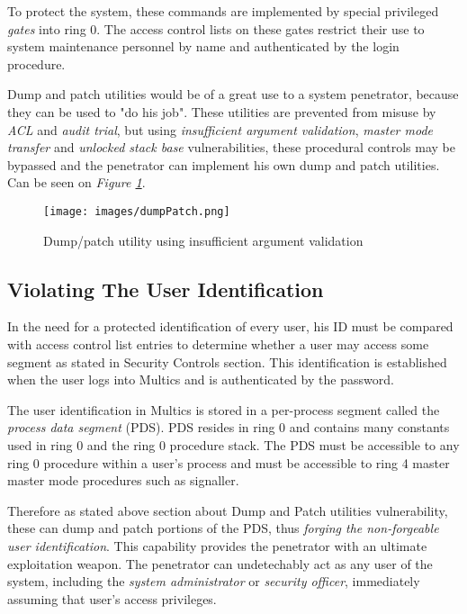 To protect the system, these commands are implemented by special privileged \textit{gates} into ring 0. The access control 
lists on these gates restrict their use to system maintenance personnel by name and authenticated by the login procedure.

Dump and patch utilities would be of a great use to a system penetrator, because they can be used to "do his job". These 
utilities are prevented from misuse by \textit{ACL} and \textit{audit trial}, but using  \textit{insufficient argument
validation}, \textit{master mode transfer} and \textit{unlocked stack base} vulnerabilities, these procedural controls 
may be bypassed and the penetrator can implement his own dump and patch utilities. Can be seen on \textit{Figure \ref{dump/patch}}.

\begin{figure}
    \centering
    \texttt{[image: images/dumpPatch.png]}
    \caption{Dump/patch utility using insufficient argument validation}
    \label{dump/patch}
\end{figure}

\subsection{Violating The User Identification}

In the need for a protected identification of every user, his ID must be compared with access control list entries 
to determine whether a user may access some segment as stated in Security Controls section.
This identification is established when the user logs into Multics and is authenticated by the password.

The user identification in Multics is stored in a per-process segment called the \textit{process data segment} (PDS).
PDS resides in ring 0 and contains many constants used in ring 0 and the ring 0 procedure stack. The PDS must be 
accessible to any ring 0 procedure within a user's process and must be accessible to ring 4 master master mode 
procedures such as signaller.

Therefore as stated above section about Dump and Patch utilities vulnerability, these can dump and patch portions of the 
PDS, thus \textit{forging the non-forgeable user identification}.
This capability provides the penetrator with an ultimate exploitation weapon. The penetrator can undetechably act as any 
user of the system, including the \textit{system administrator} or \textit{security officer}, immediately assuming that 
user's access privileges.

